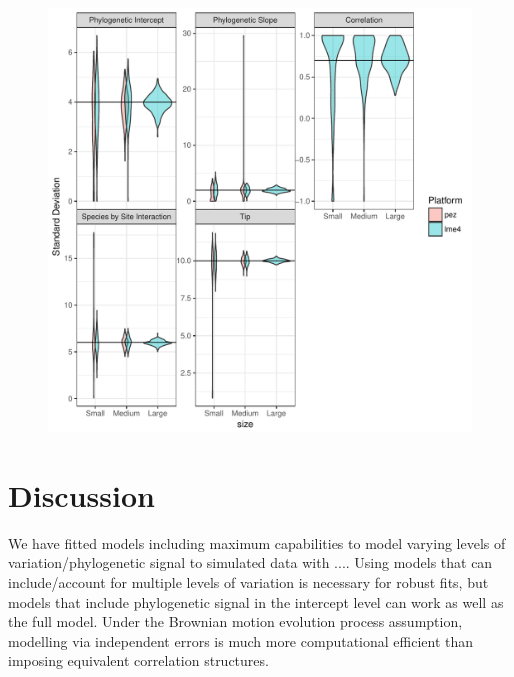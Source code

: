 \begin{center}
\begin{figure}[h]
\includegraphics[scale=0.8,page=2]{./csplot.pdf}
\end{figure}
\end{center}


\newpage

\section{Discussion}

We have fitted models including maximum capabilities to model varying levels of variation/phylogenetic signal to simulated data with ....
Using models that can include/account for multiple levels of variation is necessary for robust fits, but models that include phylogenetic signal in the intercept level can work as well as the full model.
Under the Brownian motion evolution process assumption, modelling via independent errors is much more computational efficient than imposing equivalent correlation structures.

